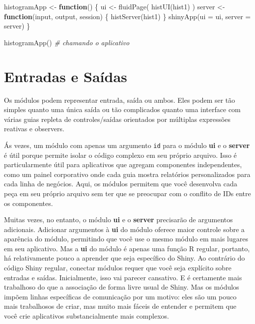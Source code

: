 \documentclass[
]{book}
\newenvironment{Shaded}{\begin{snugshade}}{\end{snugshade}}
\newcommand{\AttributeTok}[1]{\textcolor[rgb]{0.77,0.63,0.00}{#1}}
\newcommand{\CommentTok}[1]{\textcolor[rgb]{0.56,0.35,0.01}{\textit{#1}}}
\newcommand{\ControlFlowTok}[1]{\textcolor[rgb]{0.13,0.29,0.53}{\textbf{#1}}}
\newcommand{\FunctionTok}[1]{\textcolor[rgb]{0.00,0.00,0.00}{#1}}
\newcommand{\NormalTok}[1]{#1}
\newcommand{\OtherTok}[1]{\textcolor[rgb]{0.56,0.35,0.01}{#1}}
\newcommand{\StringTok}[1]{\textcolor[rgb]{0.31,0.60,0.02}{#1}}
\begin{document}
\begin{Shaded}
\begin{Highlighting}[]
\NormalTok{histogramApp }\OtherTok{\textless{}{-}} \ControlFlowTok{function}\NormalTok{() \{}
\NormalTok{  ui }\OtherTok{\textless{}{-}} \FunctionTok{fluidPage}\NormalTok{(}
    \FunctionTok{histUI}\NormalTok{(}\StringTok{\textquotesingle{}hist1\textquotesingle{}}\NormalTok{)}
\NormalTok{  )}
\NormalTok{  server }\OtherTok{\textless{}{-}} \ControlFlowTok{function}\NormalTok{(input, output, session) \{}
    \FunctionTok{histServer}\NormalTok{(}\StringTok{\textquotesingle{}hist1\textquotesingle{}}\NormalTok{)}
\NormalTok{  \}}
  \FunctionTok{shinyApp}\NormalTok{(}\AttributeTok{ui =}\NormalTok{ ui, }\AttributeTok{server =}\NormalTok{ server)  }
\NormalTok{\}}

\FunctionTok{histogramApp}\NormalTok{() }\CommentTok{\# chamando o aplicativo}
\end{Highlighting}
\end{Shaded}

\hypertarget{entradas-e-sauxeddas}{%
\section{\texorpdfstring{\textbf{Entradas e Saídas}}{Entradas e Saídas}}\label{entradas-e-sauxeddas}}

Os módulos podem representar entrada, saída ou ambos. Eles podem ser tão simples quanto uma única saída ou tão complicados quanto uma interface com várias guias repleta de controles/saídas orientados por múltiplas expressões reativas e observers.

Ás vezes, um módulo com apenas um argumento \texttt{id} para o módulo \textbf{ui} e o \textbf{server} é útil porque permite isolar o código complexo em seu próprio arquivo. Isso é particularmente útil para aplicativos que agregam componentes independentes, como um painel corporativo onde cada guia mostra relatórios personalizados para cada linha de negócios. Aqui, os módulos permitem que você desenvolva cada peça em seu próprio arquivo sem ter que se preocupar com o conflito de IDs entre os componentes.

Muitas vezes, no entanto, o módulo \textbf{ui} e o \textbf{server} precisarão de argumentos adicionais. Adicionar argumentos à \textbf{ui} do módulo oferece maior controle sobre a aparência do módulo, permitindo que você use o mesmo módulo em mais lugares em seu aplicativo. Mas a \textbf{ui} do módulo é apenas uma função R regular, portanto, há relativamente pouco a aprender que seja específico do Shiny. Ao contrário do código Shiny regular, conectar módulos requer que você seja explícito sobre entradas e saídas. Inicialmente, isso vai parecer cansativo. E é certamente mais trabalhoso do que a associação de forma livre usual de Shiny. Mas os módulos impõem linhas específicas de comunicação por um motivo: eles são um pouco mais trabalhosos de criar, mas muito mais fáceis de entender e permitem que você crie aplicativos substancialmente mais complexos.
\end{document}
